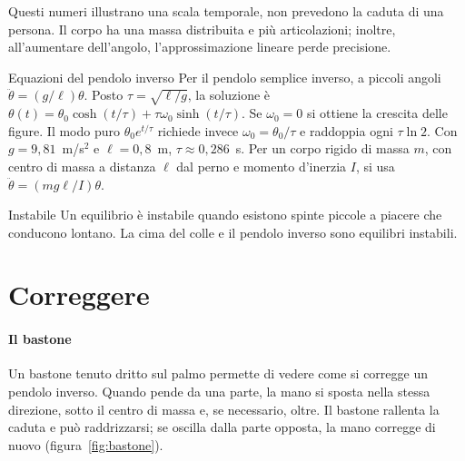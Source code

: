 \documentclass[11pt,a4paper,twoside=false,headinclude,footinclude]{scrartcl}
\begin{document}
Questi numeri illustrano una scala temporale, non prevedono la caduta di una persona. Il corpo ha una massa distribuita e più articolazioni; inoltre, all'aumentare dell'angolo, l'approssimazione lineare perde precisione.

\begin{formule}{Equazioni del pendolo inverso}
Per il pendolo semplice inverso, a piccoli angoli $\ddot{\theta}=(g/\ell)\theta$. Posto $\tau=\sqrt{\ell/g}$, la soluzione è $\theta(t)=\theta_0\cosh(t/\tau)+\tau\omega_0\sinh(t/\tau)$. Se $\omega_0=0$ si ottiene la crescita delle figure. Il modo puro $\theta_0e^{t/\tau}$ richiede invece $\omega_0=\theta_0/\tau$ e raddoppia ogni $\tau\ln2$. Con $g=9{,}81$~m/s$^2$ e $\ell=0{,}8$~m, $\tau\approx0{,}286$~s. Per un corpo rigido di massa $m$, con centro di massa a distanza $\ell$ dal perno e momento d'inerzia $I$, si usa $\ddot{\theta}=(mg\ell/I)\theta$.
\end{formule}

\begin{parola}{Instabile}
Un equilibrio è instabile quando esistono spinte piccole a piacere che conducono lontano. La cima del colle e il pendolo inverso sono equilibri instabili.
\end{parola}

\section{Correggere}\label{sec:correggere}

\paragraph{Il bastone} Un bastone tenuto dritto sul palmo permette di vedere come si corregge un pendolo inverso. Quando pende da una parte, la mano si sposta nella stessa direzione, sotto il centro di massa e, se necessario, oltre. Il bastone rallenta la caduta e può raddrizzarsi; se oscilla dalla parte opposta, la mano corregge di nuovo (figura~\ref{fig:bastone}).
\end{document}
